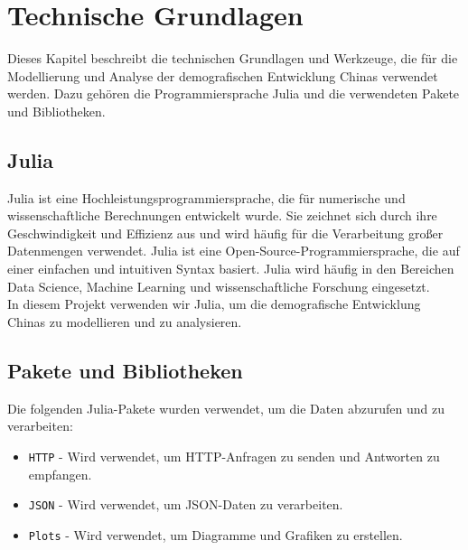 \section{Technische Grundlagen}
Dieses Kapitel beschreibt die technischen Grundlagen und Werkzeuge, die für die Modellierung und Analyse der demografischen Entwicklung Chinas verwendet werden. Dazu gehören die Programmiersprache Julia und die verwendeten Pakete und Bibliotheken.

\subsection{Julia}
Julia ist eine Hochleistungsprogrammiersprache, die für numerische und wissenschaftliche Berechnungen entwickelt wurde. Sie zeichnet sich durch ihre Geschwindigkeit und Effizienz aus und wird häufig für die Verarbeitung großer Datenmengen verwendet. Julia ist eine Open-Source-Programmiersprache, die auf einer einfachen und intuitiven Syntax basiert. Julia wird häufig in den Bereichen Data Science, Machine Learning und wissenschaftliche Forschung eingesetzt.\\

In diesem Projekt verwenden wir Julia, um die demografische Entwicklung Chinas zu modellieren und zu analysieren.

\subsection{Pakete und Bibliotheken}
Die folgenden Julia-Pakete wurden verwendet, um die Daten abzurufen und zu verarbeiten:
\begin{itemize}
    \item \texttt{HTTP} - Wird verwendet, um HTTP-Anfragen zu senden und Antworten zu empfangen.
    \item \texttt{JSON}  - Wird verwendet, um JSON-Daten zu verarbeiten.
    \item \texttt{Plots} - Wird verwendet, um Diagramme und Grafiken zu erstellen.
\end{itemize}

